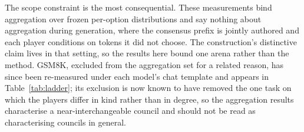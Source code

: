 The scope constraint is the most consequential. These measurements bind
aggregation over frozen per-option distributions and say nothing about
aggregation during generation, where the consensus prefix is jointly authored and
each player conditions on tokens it did not choose. The construction's
distinctive claim lives in that setting, so the results here bound one arena
rather than the method. GSM8K, excluded from the aggregation set for a related reason,
has since been re-measured under each model's chat template and appears in
Table~\ref{tab:ladder}; its exclusion is now known to have removed the one task
on which the players differ in kind rather than in degree, so the aggregation
results characterise a near-interchangeable council and should not be read as
characterising councils in general.
